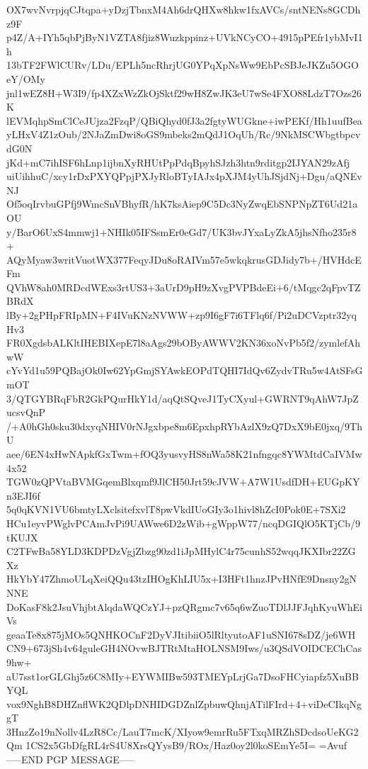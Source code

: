 OX7wvNvrpjqCJtqpa+yDzjTbnxM4Ah6drQHXw8hkw1fxAVCs/sntNENs8GCDhz9F
p4Z/A+IYh5qbPjByN1VZTA8fjiz8Wuzkppinz+UVkNCyCO+4915pPEfr1ybMvI1h
13bTF2FWlCURv/LDu/EPLh5ncRhrjUG0YPqXpNsWw9EbPcSBJeJKZu5OGOeY/OMy
jnl1wEZ8H+W3I9/fp4XZxWzZkOjSktf29wH8ZwJK3eU7wSe4FXO88LdzT7Ozs26K
lEVMqhpSmClCeJUjza2FzqP/QBiQhyd0fJ3a2fgtyWUGkne+iwPEKf/Hh1uufBea
yLHxV4Z1zOub/2NJaZmDwi8oGS9mbeks2mQdJ1OqUh/Rc/9NkMSCWbgtbpcvdG0N
jKd+mC7ihISF6hLnp1ijbnXyRHUtPpPdqBpyhSJzh3htn9rditgp2IJYAN29zAfj
uiUihhuC/xcy1rDxPXYQPpjPXJyRloBTyIAJx4pXJM4yUhJSjdNj+Dgu/aQNEvNJ
Of5oqIrvbuGPfj9WmcSnVBhyfR/hK7ksAiep9C5Dc3NyZwqEbSNPNpZT6Ud21aOU
y/BarO6UxS4mmwj1+NHIk05IFSsmEr0eGd7/UK3bvJYxaLyZkA5jhsNfho235r8+
AQyMyaw3writVuotWX377FeqyJDu8oRAIVm57e5wkqkrusGDJidy7b+/HVHdcEFm
QVhW8ah0MRDcdWExs3rtUS3+3aUrD9pH9zXvgPVPBdeEi+6/tMqgc2qFpvTZBRdX
lBy+2gPHpFRIpMN+F4IVuKNzNVWW+zp9I6gF7i6TFlq6f/Pi2uDCVzptr32yqHv3
FR0XgdsbALKltIHEBIXepE7l8aAgs29bOByAWWV2KN36xoNvPb5f2/zymlefAhwW
cYvYd1u59PQBajOk0Iw62YpGmjSYAwkEOPdTQHI7IdQv6ZydvTRu5w4AtSFsGmOT
3/QTGYBRqFbR2GkPQurHkY1d/aqQtSQveJ1TyCXyul+GWRNT9qAhW7JpZucsvQnP
/+A0hGh0sku30dxyqNHIV0rNJgxbpe8m6EpxhpRYbAzlX9zQ7DxX9bE0jxq/9ThU
aee/6EN4xHwNApkfGxTwm+fOQ3yusvyHS8nWa58K21nfngqc8YWMtdCaIVMw4x52
TGW0zQPVtaBVMGqemBlxqmf9JlCH50Jrt59cJVW+A7W1UsdfDH+EUGpKYn3EJI6f
5q0qKVN1VU6bmtyLXclsitefxvlT8pwVkdIUoGIy3o1hivl8hZcI0Pok0E+7SXi2
HCu1eyvPWglvPCAmJvPi9UAWwe6D2zWib+gWppW77/ncqDGIQlO5KTjCb/9tKUJX
C2TFwBa58YLD3KDPDzVgjZbzg90zd1iJpMHylC4r75cunhS52wqqJKXIbr22ZGXz
HkYbY47ZhmoULqXeiQQu43tzIHOgKhLIU5x+I3HFt1hnzJPvHNfE9Dnsny2gNNNE
DoKasF8k2JsuVhjbtAlqdaWQCzYJ+pzQRgmc7v65q6wZuoTDlJJFJqhKyuWhEiVs
geaaTe8x875jMOs5QNHKOCnF2DyVJItibiiO5lRltyutoAF1uSNI678sDZ/je6WH
CN9+673jSh4v64guleGH4NOvwBJTRtMtaHOLNSM9Iws/u3QSdVOIDCEChCas9hw+
aU7sst1orGLGhj5z6C8MIy+EYWMIBw593TMEYpLrjGa7DsoFHCyiapfz5XuBBYQL
vox9NghB8DHZnflWK2QDlpDNHIDGDZnlZpbuwQhnjATilFIrd+4+viDeCIkqNggT
3HnzZo19nNollv4LzR8Cc/LauT7mcK/XIyow9emrRu5FTxqMRZhSDcdsoUeKG2Qm
1CS2x5GbDfgRL4rS4U8XrsQYysB9/ROx/Haz0oy2l0koSEmYe5I=
=Avuf
-----END PGP MESSAGE-----
